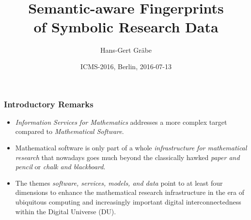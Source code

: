 \documentclass{beamer}
\title[Semantic-aware Fingerprints]{Semantic-aware Fingerprints\\ of Symbolic
  Research Data}
\author{Hans-Gert Gr\"abe}
\institute[]{Leipzig University, Germany\\
\texttt{http://bis.informatik.uni-leipzig.de/HansGertGraebe}}
\date{ICMS-2016, Berlin, 2016-07-13}
\begin{document}
\begin{frame}
\titlepage
\end{frame}

\begin{frame}
\frametitle{Introductory Remarks}
\begin{itemize}
\item \emph{Information Services for Mathematics} addresses a more complex
  target compared to \emph{Mathematical Software}.
\item Mathematical software is only part of a whole \emph{infrastructure for
  mathematical research} that nowadays goes much beyond the classically hawked
  \emph{paper and pencil} or \emph{chalk and blackboard}.
\item The themes \emph{software, services, models, and data} point to at least
  four dimensions to enhance the mathematical research infrastructure in the
  era of ubiquitous computing and increasingly important digital
  interconnectedness within the Digital Universe (DU).
\end{itemize}
\end{frame}
\end{document}
